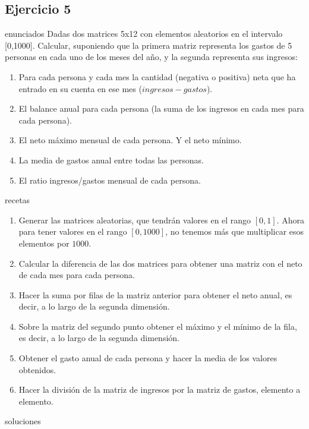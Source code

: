 \subsection{Ejercicio 5}
\def\parte{enunciados}
\ifx\capitulo\parte
Dadas dos matrices 5x12 con elementos aleatorios en el intervalo [0,1000]. Calcular, suponiendo que la primera matriz representa los gastos de 5 personas en cada uno de los meses del año, y la segunda representa sus ingresos:
\begin{enumerate}
\item Para cada persona y cada mes la cantidad (negativa o positiva) neta que ha entrado en su cuenta en ese mes ($ingresos - gastos$).
\item El balance anual para cada persona (la suma de los ingresos en cada mes para cada persona).
\item El neto máximo mensual de cada persona. Y el neto mínimo.
\item La media de gastos anual entre todas las personas.
\item El ratio ingresos/gastos mensual de cada persona.
\end{enumerate}
\fi

\def\parte{recetas}
\ifx\capitulo\parte
\begin{enumerate}
\item Generar las matrices aleatorias, que tendrán valores en el rango $[0,1]$. Ahora para tener valores en el rango $[0,1000]$, no tenemos más que multiplicar esos elementos por $1000$.
\item Calcular la diferencia de las dos matrices para obtener una matriz con el neto de cada mes para cada persona.
\item Hacer la suma por filas de la matriz anterior para obtener el neto anual, es decir, a lo largo de la segunda dimensión.
\item Sobre la matriz del segundo punto obtener el máximo y el mínimo de la fila, es decir, a lo largo de la segunda dimensión.
\item Obtener el gasto anual de cada persona y hacer la media de los valores obtenidos.
\item Hacer la división de la matriz de ingresos por la matriz de gastos, elemento a elemento.
\end{enumerate}
\fi

\def\parte{soluciones}
\ifx\capitulo\parte

\fi
